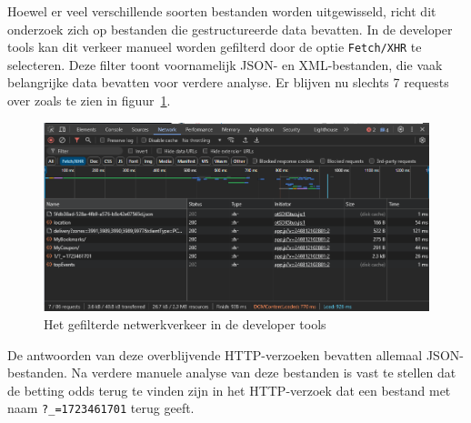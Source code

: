 Hoewel er veel verschillende soorten bestanden worden uitgewisseld, richt dit onderzoek zich op bestanden die gestructureerde data bevatten. In de developer tools kan dit verkeer manueel worden gefilterd door de optie \texttt{Fetch/XHR} te selecteren. Deze filter toont voornamelijk JSON- en XML-bestanden, die vaak belangrijke data bevatten voor verdere analyse.
Er blijven nu slechts 7 requests over zoals te zien in figuur~\ref{fig:networktab3}.

\begin{figure}[h]
    \centering
    \includegraphics[width=\linewidth]{graphics/DevTools3.png}
    \caption{Het gefilterde netwerkverkeer in de developer tools}
    \label{fig:networktab3}
\end{figure}

De antwoorden van deze overblijvende HTTP-verzoeken bevatten allemaal JSON-bestanden. Na verdere manuele analyse van deze bestanden is vast te stellen dat de betting odds terug te vinden zijn in het HTTP-verzoek dat een bestand met naam \texttt{?\_=1723461701} terug geeft.

